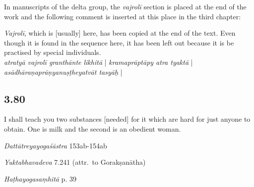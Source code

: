 \begin{ekdosis}
\begin{testimonia}[hp03_079]
\end{testimonia}

\begin{philcomm}[hp03_079]
In manuscripts of the delta group, the \emph{vajrolī} section is placed at the end of the work and the following comment is inserted at this place in the third chapter:
\begin{versinnote}
\emph{Vajrolī}, which is [usually] here, has been copied at the end of the text. Even though it is found in the sequence here, it has been left out because it is be practised by special individuals.\\
\emph{atratyā vajrolī granthānte likhitā} | \emph{kramaprāptāpy atra tyaktā} | \emph{asādhāraṇaprāṇyanuṣṭheyatvāt tasyāḥ} |
\end{versinnote}

\end{philcomm}


\subsection*{3.80}
\begin{translation}[hp03_080]
I shall teach you two substances [needed] for it which are hard for just anyone to obtain. One is milk and the second is an obedient woman.
\end{translation}

\begin{sources}[hp03_080]
\emph{Dattātreyayogaśāstra} 153ab-154ab
\begin{versinnote}
\end{versinnote}
\end{sources}

\begin{testimonia}[hp03_080]
\emph{Yuktabhavadeva} 7.241 (attr.~to Gorakṣanātha)
\begin{versinnote}
\end{versinnote}

\emph{Haṭhayogasaṃhitā} p. 39
\begin{versinnote}
\end{versinnote}


\end{testimonia}
\end{ekdosis}
